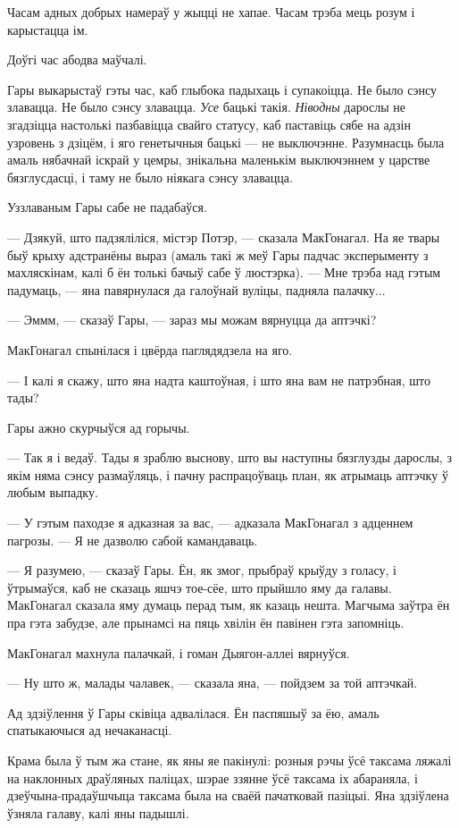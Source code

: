 Часам адных добрых намераў у жыцці не хапае. Часам трэба мець розум і карыстацца ім.

Доўгі час абодва маўчалі.

Гары выкарыстаў гэты час, каб глыбока падыхаць і супакоіцца. Не было сэнсу злавацца.
Не было сэнсу злавацца. \emph{Усе} бацькі такія. \emph{Ніводны} дарослы не згадзіцца
настолькі пазбавіцца свайго статусу, каб паставіць сябе на адзін узровень з дзіцём,
і яго генетычныя бацькі --- не выключэнне. Разумнасць была амаль нябачнай іскрай 
у цемры, знікальна маленькім выключэннем у царстве бязглусдасці, і таму не было
ніякага сэнсу злавацца.

Уззлаваным Гары сабе не падабаўся.

--- Дзякуй, што падзяліліся, містэр Потэр, --- сказала МакГонагал. На яе твары быў
крыху адстранёны выраз (амаль такі ж меў Гары падчас эксперыменту з махляскінам,
калі б ён толькі бачыў сабе ў люстэрка). --- Мне трэба над гэтым падумаць, ---
яна павярнулася да галоўнай вуліцы, падняла палачку...

--- Эммм, --- сказаў Гары, --- зараз мы можам вярнуцца да аптэчкі?

МакГонагал спынілася і цвёрда паглядядзела на яго. 

--- І калі я скажу, што яна надта каштоўная, і што яна вам не патрэбная, што тады?

Гары ажно скурчыўся ад горычы. 

--- Так я і ведаў. Тады я зраблю выснову, што вы наступны бязглузды дарослы, з якім
няма сэнсу размаўляць, і пачну распрацоўваць план, як атрымаць аптэчку ў любым
выпадку.

--- У гэтым паходзе я адказная за вас, --- адказала МакГонагал з адценнем пагрозы. ---
Я не дазволю сабой камандаваць.

--- Я разумею, --- сказаў Гары. Ён, як змог, прыбраў крыўду з голасу, і ўтрымаўся,
каб не сказаць яшчэ тое-сёе, што прыйшло яму да галавы. МакГонагал сказала яму 
думаць перад тым, як казаць нешта. Магчыма заўтра ён пра гэта забудзе, але 
прынамсі на пяць хвілін ён павінен гэта запомніць.

МакГонагал махнула палачкай, і гоман Дыягон-аллеі вярнуўся.

--- Ну што ж, малады чалавек, --- сказала яна, --- пойдзем за той аптэчкай.

Ад здзіўлення ў Гары сківіца адвалілася. Ён паспяшыў за ёю, амаль спатыкаючыся
ад нечаканасці.

\later

Крама была ў тым жа стане, як яны яе пакінулі: розныя рэчы ўсё таксама ляжалі на 
наклонных драўляных паліцах, шэрае ззянне ўсё таксама іх абараняла, і дзеўчына-прадаўшчыца
таксама была на сваёй пачатковай пазіцыі. Яна здзіўлена ўзняла галаву, калі яны падышлі. 

